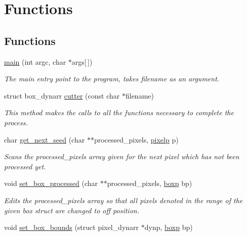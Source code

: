 \hypertarget{group__funcs}{
\section{Functions}
\label{group__funcs}
}
\subsection*{Functions}
\begin{DoxyCompactItemize}
\item 
\hyperlink{group__funcs_ga01d952f60539143bb330b7b6571a3136}{main} (int argc, char $\ast$args\mbox{[}$\,$\mbox{]})
\begin{DoxyCompactList}\small\item\em The main entry point to the program, takes filename as an argument. \item\end{DoxyCompactList}\item 
struct box\_\-dynarr \hyperlink{group__funcs_ga0c09f6c919f86bbdfa30cfd1f28bd40b}{cutter} (const char $\ast$filename)
\begin{DoxyCompactList}\small\item\em This method makes the calls to all the functions necessary to complete the process. \item\end{DoxyCompactList}\item 
char \hyperlink{group__funcs_ga4b342011044f2cf83a5b393475743ba3}{get\_\-next\_\-seed} (char $\ast$$\ast$processed\_\-pixels, \hyperlink{structpixel}{pixelp} p)
\begin{DoxyCompactList}\small\item\em Scans the processed\_\-pixels array given for the next pixel which has not been processed yet. \item\end{DoxyCompactList}\item 
void \hyperlink{group__funcs_gabe3948a5318c33d57f02e254f224127a}{set\_\-box\_\-processed} (char $\ast$$\ast$processed\_\-pixels, \hyperlink{structbox}{boxp} bp)
\begin{DoxyCompactList}\small\item\em Edits the processed\_\-pixels array so that all pixels denoted in the range of the given box struct are changed to off position. \item\end{DoxyCompactList}\item 
void \hyperlink{group__funcs_ga7a905350fa166e9974455f590bea90ba}{set\_\-box\_\-bounds} (struct pixel\_\-dynarr $\ast$dynp, \hyperlink{structbox}{boxp} bp)

\end{DoxyCompactItemize}
